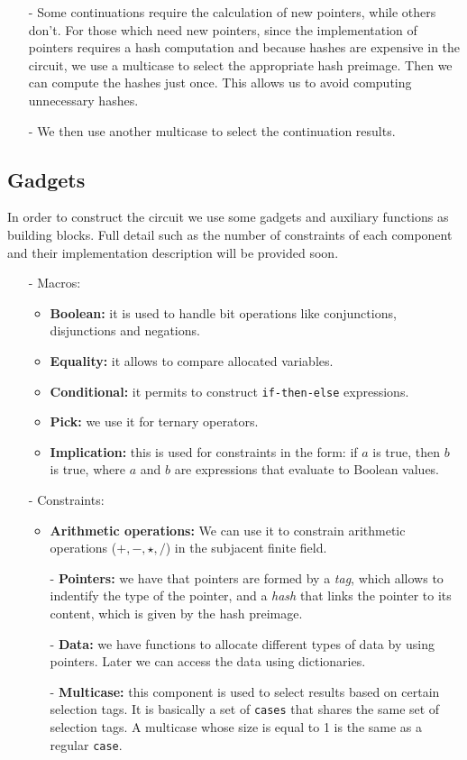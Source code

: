 \documentclass[10pt, english]{article}
\begin{document}
\begin{itemize}
  \item[-] Some continuations require the calculation of new pointers, while others don't. For those which need new pointers, since the implementation of pointers requires a hash computation and because hashes are expensive in the circuit, we use a multicase to select the appropriate hash preimage. Then we can compute the hashes just once. This allows us to avoid computing unnecessary hashes.
	\item[-] We then use another multicase to select the continuation results.
\end{itemize}

\subsection{Gadgets}

In order to construct the circuit we use some gadgets and auxiliary functions as building blocks. Full detail such as the number of constraints of each component and their implementation description will be provided soon.

\begin{itemize}
	\item[-] Macros:
	\begin{itemize}
		\item \textbf{Boolean:} it is used to handle bit operations like conjunctions, disjunctions and negations.
    \item \textbf{Equality:} it allows to compare allocated variables.
		\item \textbf{Conditional:} it permits to construct \verb|if-then-else| expressions.
		\item \textbf{Pick:} we use it for ternary operators.
		\item \textbf{Implication:} this is used for constraints in the form: if $a$ is true, then $b$ is true, where $a$ and $b$ are expressions that evaluate to Boolean values.
	\end{itemize}
	\item[-] Constraints:
	\begin{itemize}
    \item \textbf{Arithmetic operations:} We can use it to constrain arithmetic operations ($+, -, \star, \slash$) in the subjacent finite field.
	  \item[-] \textbf{Pointers:} we have that pointers are formed by a \emph{tag}, which allows to indentify the type of the pointer, and a \emph{hash} that links the pointer to its content, which is given by the hash preimage.
    \item[-] \textbf{Data:} we have functions to allocate different types of data by using pointers. Later we can access the data using dictionaries.
    \item[-] \textbf{Multicase:} this component is used to select results based on certain selection tags. It is basically a set of \verb|cases| that shares the same set of selection tags. A multicase whose size is equal to 1 is the same as a regular \verb|case|.
  \end{itemize}
\end{itemize}
\end{document}
